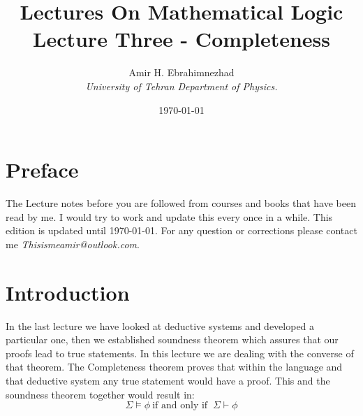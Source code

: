\documentclass[9pt,a4paper]{article}
\title{Lectures On Mathematical Logic\\ \large Lecture Three - Completeness}
\date{\today}
\author{Amir H. Ebrahimnezhad \\ \small \textit{University of Tehran Department of Physics.}}
\newcounter{theo}
\begin{document}
    \maketitle
    \section*{Preface}
        The Lecture notes before you are followed from courses and books that have been read by me. I would try to work and update this every once in a while. This edition is updated until \today. For any question or corrections please contact me \textit{Thisismeamir@outlook.com}.
    \section*{Introduction}
        In the last lecture we have looked at deductive systems and developed a particular one, then we established soundness theorem which assures that our proofs lead to true statements. In this lecture we are dealing with the converse of that theorem. The Completeness theorem proves that within the language and that deductive system any true statement would have a proof. This and the soundness theorem together would result in:
        \begin{equation}
            \Sigma \vDash \phi \ \text{if and only if } \ \Sigma \vdash \phi
        \end{equation}
\end{document}
